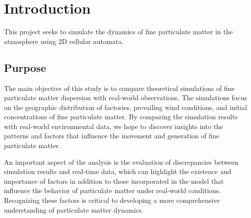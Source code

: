 \section{Introduction}
    This project seeks to simulate the dynamics of fine particulate matter in the atmosphere using 2D cellular automata.
    \subsection{Purpose}
        The main objective of this study is to compare theoretical simulations of fine particulate matter dispersion with real-world observations. The simulations focus on the geographic distribution of factories, prevailing wind conditions, and initial concentrations of fine particulate matter. By comparing the simulation results with real-world environmental data, we hope to discover insights into the patterns and factors that influence the movement and generation of fine particulate matter.

        An important aspect of the analysis is the evaluation of discrepancies between simulation results and real-time data, which can highlight the existence and importance of factors in addition to those incorporated in the model that influence the behavior of particulate matter under real-world conditions. Recognizing these factors is critical to developing a more comprehensive understanding of particulate matter dynamics.

